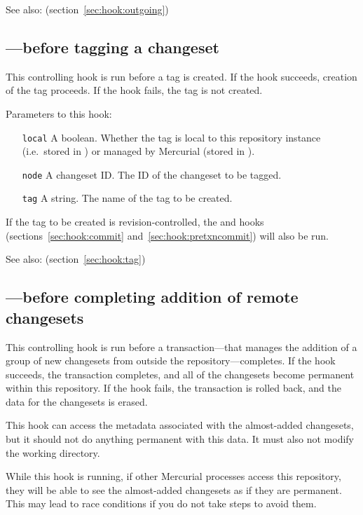 See also:  (section~\ref{sec:hook:outgoing})

\subsection{---before tagging a changeset}
\label{sec:hook:pretag}

This controlling hook is run before a tag is created.  If the hook
succeeds, creation of the tag proceeds.  If the hook fails, the tag is
not created.

Parameters to this hook:
\begin{itemize}
\item[\texttt{local}] A boolean.  Whether the tag is local to this
  repository instance (i.e.~stored in ) or
  managed by Mercurial (stored in ).
\item[\texttt{node}] A changeset ID.  The ID of the changeset to be tagged.
\item[\texttt{tag}] A string.  The name of the tag to be created.
\end{itemize}

If the tag to be created is revision-controlled, the 
and  hooks (sections~\ref{sec:hook:commit}
and~\ref{sec:hook:pretxncommit}) will also be run.

See also:  (section~\ref{sec:hook:tag})

\subsection{---before completing addition of
  remote changesets}
\label{sec:hook:pretxnchangegroup}

This controlling hook is run before a transaction---that manages the
addition of a group of new changesets from outside the
repository---completes.  If the hook succeeds, the transaction
completes, and all of the changesets become permanent within this
repository.  If the hook fails, the transaction is rolled back, and
the data for the changesets is erased.

This hook can access the metadata associated with the almost-added
changesets, but it should not do anything permanent with this data.
It must also not modify the working directory.

While this hook is running, if other Mercurial processes access this
repository, they will be able to see the almost-added changesets as if
they are permanent.  This may lead to race conditions if you do not
take steps to avoid them.

